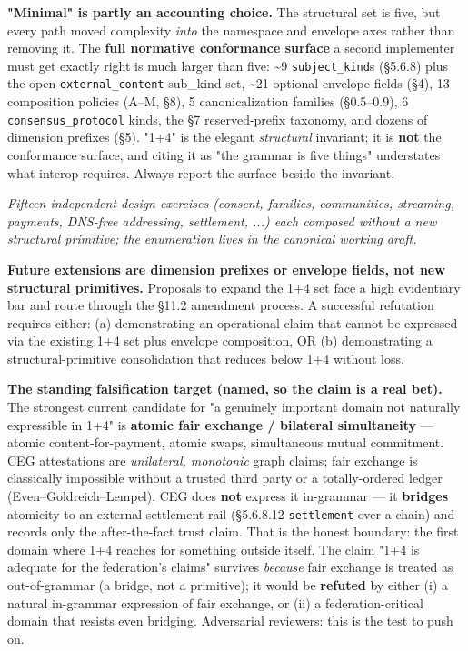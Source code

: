 \documentclass[11pt]{article}
\begin{document}
\textbf{"Minimal" is partly an accounting choice.} The structural set is five, but every path moved complexity \textit{into} the namespace and envelope axes rather than removing it. The \textbf{full normative conformance surface} a second implementer must get exactly right is much larger than five: \textasciitilde{}9 \texttt{subject\_kind}s (§5.6.8) plus the open \texttt{external\_content} sub\_kind set, \textasciitilde{}21 optional envelope fields (§4), 13 composition policies (A–M, §8), 5 canonicalization families (§0.5–0.9), 6 \texttt{consensus\_protocol} kinds, the §7 reserved-prefix taxonomy, and dozens of dimension prefixes (§5). "1+4" is the elegant \textit{structural} invariant; it is \textbf{not} the conformance surface, and citing it as "the grammar is five things" understates what interop requires. Always report the surface beside the invariant.



\textit{Fifteen independent design exercises (consent, families, communities, streaming, payments, DNS-free addressing, settlement, ...) each composed without a new structural primitive; the enumeration lives in the canonical working draft.}



\textbf{Future extensions are dimension prefixes or envelope fields, not new structural primitives.} Proposals to expand the 1+4 set face a high evidentiary bar and route through the §11.2 amendment process. A successful refutation requires either: (a) demonstrating an operational claim that cannot be expressed via the existing 1+4 set plus envelope composition, OR (b) demonstrating a structural-primitive consolidation that reduces below 1+4 without loss.


\textbf{The standing falsification target (named, so the claim is a real bet).} The strongest current candidate for "a genuinely important domain not naturally expressible in 1+4" is \textbf{atomic fair exchange / bilateral simultaneity} — atomic content-for-payment, atomic swaps, simultaneous mutual commitment. CEG attestations are \textit{unilateral, monotonic} graph claims; fair exchange is classically impossible without a trusted third party or a totally-ordered ledger (Even–Goldreich–Lempel). CEG does \textbf{not} express it in-grammar — it \textbf{bridges} atomicity to an external settlement rail (§5.6.8.12 \texttt{settlement} over a chain) and records only the after-the-fact trust claim. That is the honest boundary: the first domain where 1+4 reaches for something outside itself. The claim "1+4 is adequate for the federation's claims" survives \textit{because} fair exchange is treated as out-of-grammar (a bridge, not a primitive); it would be \textbf{refuted} by either (i) a natural in-grammar expression of fair exchange, or (ii) a federation-critical domain that resists even bridging. Adversarial reviewers: this is the test to push on.
\end{document}
